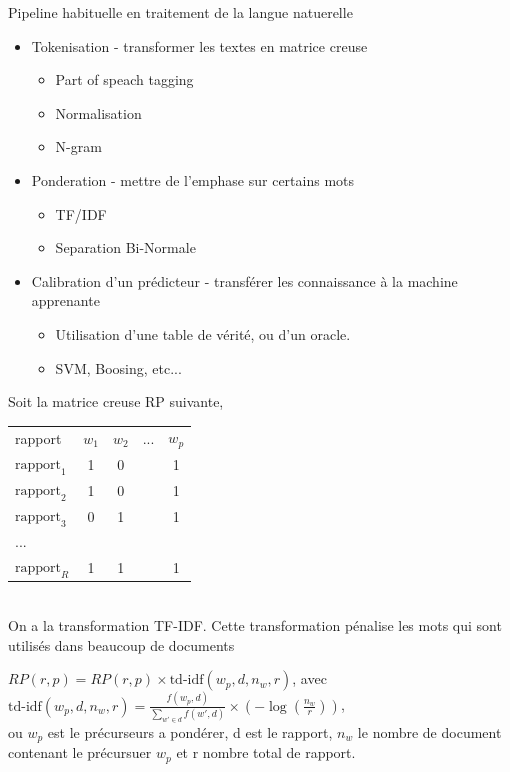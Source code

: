 \begin{frame}	
	Pipeline habituelle en traitement de la langue natuerelle
	
	\begin{itemize}
		\item Tokenisation - transformer les textes en matrice creuse
		\begin{itemize}
			\item Part of speach tagging
			\item Normalisation
			\item N-gram
		\end{itemize}
		
		\item Ponderation - mettre de l'emphase sur certains mots
		\begin{itemize}
			\item TF/IDF
			\item Separation Bi-Normale
		\end{itemize}
		
		\item Calibration d'un prédicteur - transférer les connaissance à la machine apprenante
		\begin{itemize}
			\item Utilisation d'une table de vérité, ou d'un oracle.
			\item SVM, Boosing, etc...
		\end{itemize}
		
	\end{itemize}
\end{frame}

\begin{frame}[t]
	
	Soit la matrice creuse RP suivante, \\
	\begin{tabular}[t]{lcccc}
		rapport & $w_1$ & $w_2$ & ... & $w_p$ \\
		$\textrm{rapport}_1$ & 1 & 0 &  & 1 \\
		$\textrm{rapport}_2$ & 1 & 0 &  & 1 \\
		$\textrm{rapport}_3$ & 0 & 1 &  & 1 \\
		... &  &  &  & \\
		$\textrm{rapport}_R$ & 1 & 1 &  & 1 \\
	\end{tabular}\\
	\bigskip
	On a la transformation TF-IDF. Cette transformation pénalise les mots qui sont utilisés dans beaucoup de documents\\
	\bigskip
	
	$RP(r, p) = RP(r, p) \times \textrm{td-idf}(w_p, d, n_w, r)$, avec \\
	$\textrm{td-idf}(w_p, d, n_w, r) = \frac{f(w_p, d)}{\sum_{w' \in d}f(w', d)} \times (-\log(\frac{n_w}{r}))$,\\
	ou $w_p$ est le précurseurs a pondérer, d est le rapport,  $n_w$ le nombre de document contenant le précursuer $w_p$ et r nombre total de rapport.	
	
\end{frame}
	

